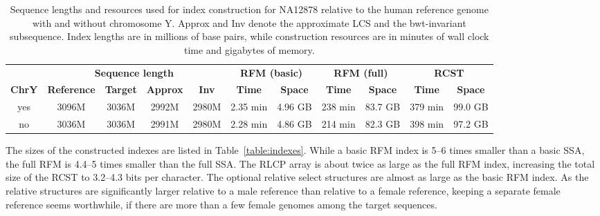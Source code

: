 \documentclass[a4paper,11pt]{llncs}
\newcommand{\RCST}{\textsf{RCST}}
\newcommand{\SSA}{\textsf{SSA}}
\newcommand{\RFM}{\textsf{RFM}}
\newcommand{\RLCP}{\textsf{RLCP}}
\newcommand{\LCS}{\textsf{LCS}}
\begin{document}
\begin{table}
\caption{Sequence lengths and resources used for index construction for NA12878 relative to the human reference genome with and without chromosome Y. Approx and Inv denote the approximate \LCS{} and the bwt-invariant subsequence. Index lengths are in millions of base pairs, while construction resources are in minutes of wall clock time and gigabytes of memory.}\label{table:construction}
\setlength{\extrarowheight}{2pt}
\setlength{\tabcolsep}{3pt}
\begin{center}
\begin{tabular}{c|cccc|cc|cc|cc}
\hline
 &
\multicolumn{4}{c|}{\textbf{Sequence length}} &
\multicolumn{2}{c|}{\textbf{\RFM{} (basic)}} &
\multicolumn{2}{c|}{\textbf{\RFM{} (full)}} &
\multicolumn{2}{c}{\textbf{\RCST}} \\
\textbf{ChrY} &
\textbf{Reference} & \textbf{Target} & \textbf{Approx} & \textbf{Inv} &
\textbf{Time} & \textbf{Space} &
\textbf{Time} & \textbf{Space} &
\textbf{Time} & \textbf{Space} \\
\hline
yes & 3096M & 3036M & 2992M & 2980M & 2.35 min & 4.96 GB & 238 min & 83.7 GB & 379 min & 99.0 GB \\
no  & 3036M & 3036M & 2991M & 2980M & 2.28 min & 4.86 GB & 214 min & 82.3 GB & 398 min & 97.2 GB \\
\hline
\end{tabular}
\end{center}
\end{table}

The sizes of the constructed indexes are listed in Table~\ref{table:indexes}. While a basic \RFM{} index is 5--6 times smaller than a basic \SSA, the full \RFM{} is 4.4--5 times smaller than the full \SSA. The \RLCP{} array is about twice as large as the full \RFM{} index, increasing the total size of the \RCST{} to 3.2--4.3 bits per character. The optional relative select structures are almost as large as the basic \RFM{} index. As the relative structures are significantly larger relative to a male reference than relative to a female reference, keeping a separate female reference seems worthwhile, if there are more than a few female genomes among the target sequences.
\end{document}
